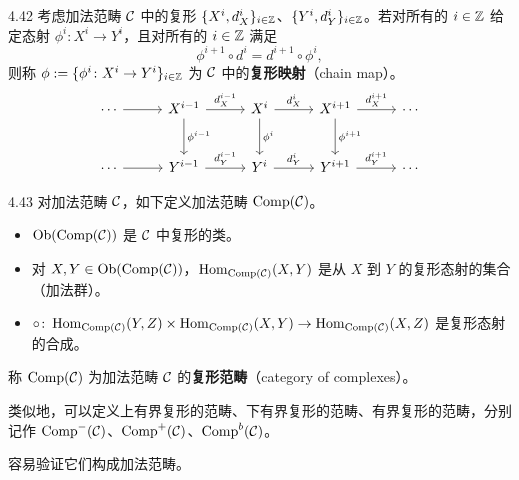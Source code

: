 \begin{definition}{4.42}
考虑加法范畴 $\mathcal{C}$ 中的复形 $\{X^i,d_X^i\}_{i\in\mathbb{Z}}$、$\{Y^i,d_Y^i\}_{i\in\mathbb{Z}}$。若对所有的 $i\in\mathbb{Z}$ 给定态射 $\phi^i\colon X^i\to Y^i$，且对所有的 $i\in\mathbb{Z}$ 满足
\[ \phi^{i+1}\circ d^i=d^{i+1}\circ\phi^i, \]
则称 $\phi:=\{\phi^i\colon X^i\to Y^i\}_{i\in\mathbb{Z}}$ 为 $\mathcal{C}$ 中的\textbf{复形映射}（chain map）。
\[\begin{tikzcd}[row sep=2.6em, column sep=2.8em]
  \cdots \arrow[r] & X^{i-1} \arrow[r,"d_X^{i-1}"] \arrow[d,"\phi^{i-1}"] & X^i \arrow[r,"d_X^i"] \arrow[d,"\phi^i"] & X^{i+1} \arrow[r,"d_X^{i+1}"] \arrow[d,"\phi^{i+1}"] & \cdots \\
  \cdots \arrow[r] & Y^{i-1} \arrow[r,"d_Y^{i-1}"] & Y^i \arrow[r,"d_Y^i"] & Y^{i+1} \arrow[r,"d_Y^{i+1}"] & \cdots
\end{tikzcd}\]
\end{definition}

\begin{definition}{4.43}
对加法范畴 $\mathcal{C}$，如下定义加法范畴 $\operatorname{Comp}(\mathcal{C})$。
\begin{itemize}
  \item $\operatorname{Ob}(\operatorname{Comp}(\mathcal{C}))$ 是 $\mathcal{C}$ 中复形的类。
  \item 对 $X,Y\in\operatorname{Ob}(\operatorname{Comp}(\mathcal{C}))$，$\operatorname{Hom}_{\operatorname{Comp}(\mathcal{C})}(X,Y)$ 是从 $X$ 到 $Y$ 的复形态射的集合（加法群）。
  \item $\circ\colon\operatorname{Hom}_{\operatorname{Comp}(\mathcal{C})}(Y,Z)\times\operatorname{Hom}_{\operatorname{Comp}(\mathcal{C})}(X,Y)\to\operatorname{Hom}_{\operatorname{Comp}(\mathcal{C})}(X,Z)$ 是复形态射的合成。
\end{itemize}
\end{definition}

称 $\operatorname{Comp}(\mathcal{C})$ 为加法范畴 $\mathcal{C}$ 的\textbf{复形范畴}（category of complexes）。

类似地，可以定义上有界复形的范畴、下有界复形的范畴、有界复形的范畴，分别记作 $\operatorname{Comp}^-(\mathcal{C})$、$\operatorname{Comp}^+(\mathcal{C})$、$\operatorname{Comp}^b(\mathcal{C})$。


容易验证它们构成加法范畴。

